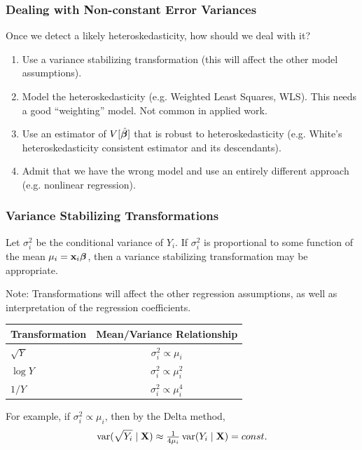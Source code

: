 \documentclass[xcolor=svgnames,9pt,english,aspectratio=169,t]{beamer}
\begin{document}
\begin{frame}
\frametitle{Dealing with Non-constant Error Variances}
Once we detect a likely heteroskedasticity, how should we deal with it?
\medskip
\pause
\begin{enumerate}
  \addtolength{\itemsep}{.5\baselineskip}
  \item Use a \alert{variance stabilizing transformation} (this will affect the other model assumptions).
  \item Model the heteroskedasticity (e.g. \alert{Weighted Least Squares, WLS}). This needs a good ``weighting'' model. Not common in applied work. 
  \item Use an estimator of $V[\hat{\boldsymbol{\beta}}]$ that is \alert{robust to
  heteroskedasticity} (e.g. White's heteroskedasticity consistent estimator and its descendants).
  \item Admit that we have the wrong model and use an entirely different approach (e.g. nonlinear regression).
\end{enumerate}
\end{frame}

\begin{frame}
\frametitle{Variance Stabilizing Transformations}

Let $\sigma_i^2$ be the conditional variance of $Y_i$. If $\sigma_i^2$ is proportional to some function of the mean $\mu_i = \mathbf{x}_i \boldsymbol{\beta}$, then a variance stabilizing transformation may be appropriate.\\\bigskip

Note: Transformations will affect the other regression assumptions, as well as interpretation of the regression coefficients. \\
\begin{center}
\begin{tabular}{lc}
\hline
Transformation & Mean/Variance Relationship  \\
\hline
$\sqrt{Y}$ & $\sigma_i^2 \propto \mu_i$  \\
$\log Y$ & $\sigma_i^2 \propto \mu_i^2$   \\
$1/Y$ & $\sigma_i^2 \propto \mu_i^4$  \\
\hline
\end{tabular}
\end{center}
For example, if $\sigma_i^2 \propto \mu_i$, then by the Delta method,
\[
\operatorname{var}(\sqrt{Y_i} \mid \mathbf{X})
\approx \tfrac{1}{4\mu_i}\operatorname{var}(Y_i \mid \mathbf{X}) = const.
\]
\end{frame}
\end{document}
